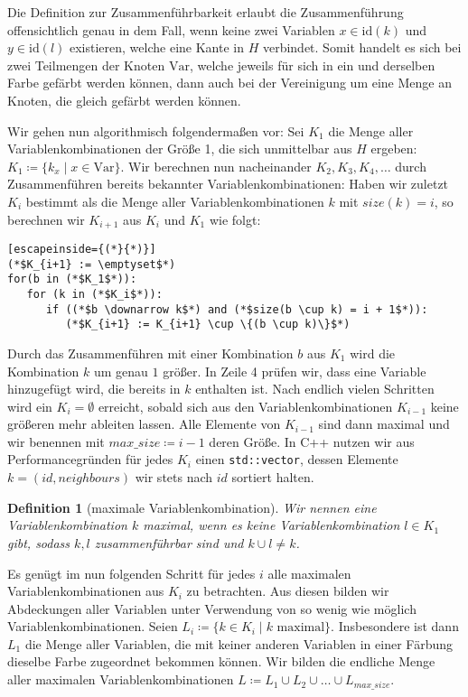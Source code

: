 \documentclass[a4paper]{article}
\newtheorem{definition}[satz]{Definition} %
\theoremstyle{nonumberplain}
\begin{document}
Die Definition zur Zusammenführbarkeit erlaubt die Zusammenführung offensichtlich genau in dem Fall, wenn keine zwei Variablen $x \in \mathrm{id}(k)$ und $y \in \mathrm{id}(l)$ existieren, welche eine Kante in $H$ verbindet. Somit handelt es sich bei zwei Teilmengen der Knoten $\mathrm{Var}$, welche jeweils für sich in ein und derselben Farbe gefärbt werden können, dann auch bei der Vereinigung um eine Menge an Knoten, die gleich gefärbt werden können.

Wir gehen nun algorithmisch folgendermaßen vor:
Sei $K_1$ die Menge aller Variablenkombinationen der Größe 1, die sich unmittelbar aus $H$ ergeben: $K_1 \coloneqq \{k_x \mid x\in \mbox{Var} \}$.
Wir berechnen nun nacheinander $K_2, K_3, K_4, \dots $ durch Zusammenführen bereits bekannter Variablenkombinationen: Haben wir zuletzt $K_i$ bestimmt als die Menge aller Variablenkombinationen $k$ mit $size(k) = i$, so berechnen wir $K_{i+1}$ aus $K_i$ und $K_1$ wie folgt:

\begin{lstlisting}[escapeinside={(*}{*)}]
(*$K_{i+1} := \emptyset$*)
for(b in (*$K_1$*)):
   for (k in (*$K_i$*)):
      if ((*$b \downarrow k$*) and (*$size(b \cup k) = i + 1$*)):
         (*$K_{i+1} := K_{i+1} \cup \{(b \cup k)\}$*)
\end{lstlisting}

Durch das Zusammenführen mit einer Kombination $b$ aus $K_1$ wird die Kombination $k$ um genau $1$ größer. In Zeile 4 prüfen wir, dass eine Variable hinzugefügt wird, die bereits in $k$ enthalten ist.
Nach endlich vielen Schritten wird ein $K_i = \emptyset$ erreicht, sobald sich aus den Variablenkombinationen $K_{i-1}$ keine größeren mehr ableiten lassen. Alle Elemente von $K_{i-1}$ sind dann maximal und wir benennen mit $max\_size \coloneqq i-1$ deren Größe. In C++ nutzen wir aus Performancegründen für jedes $K_i$ einen \texttt{std::vector}, dessen Elemente $k=(id,neighbours)$ wir stets nach $id$ sortiert halten.

\begin{definition}[maximale Variablenkombination]
	Wir nennen eine Variablenkombination $k$ maximal, wenn es keine Variablenkombination $l\in K_1$ gibt, sodass $k, l$ zusammenführbar sind und $k \cup l \neq k$.
\end{definition}

Es genügt im nun folgenden Schritt für jedes $i$ alle maximalen Variablenkombinationen aus $K_i$ zu betrachten. Aus diesen bilden wir Abdeckungen aller Variablen unter Verwendung von so wenig wie möglich Variablenkombinationen.
Seien $L_i \coloneqq \{k \in K_i \mid k \text{ maximal} \}$. Insbesondere ist dann $L_1$ die Menge aller Variablen, die mit keiner anderen Variablen in einer Färbung dieselbe Farbe zugeordnet bekommen können.
Wir bilden die endliche Menge aller maximalen Variablenkombinationen $L \coloneqq L_1 \cup L_2 \cup \dots \cup L_{max\_size}$. %
\end{document}
